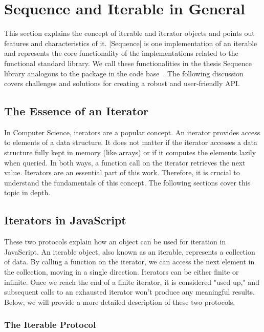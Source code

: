 \section{Sequence and Iterable in General}
\label{sec:Sequence and Iterable in General}
This section explains the concept of iterable and iterator objects and points
out features and characteristics of it. |Sequence| is one implementation of
an iterable and represents the core functionality of the implementations
related to the functional standard library. We call these functionalities in
the thesis Sequence library analogous to the package in the code
base~\cite{wildwyss_kolibri}. The following
discussion covers challenges and solutions for creating a robust and
user-friendly API.

\subsection{The Essence of an Iterator}
\label{sub:The Essence of an Iterator}
In Computer Science, iterators are a popular concept. An iterator provides
access to elements of a data structure. It does not matter if the iterator
accesses a data structure fully kept in memory (like arrays) or if it computes
the elements lazily when queried. In both ways, a function call on the iterator
retrieves the next value. Iterators are an essential part of this work.
Therefore, it is crucial to understand the fundamentals of this concept. The
following sections cover this topic in depth.

\subsection{Iterators in JavaScript}
\label{sub:Iterators in JavaScript}
These two protocols explain how an object can be used for iteration in
JavaScript. An iterable object, also known as an iterable, represents a
collection of data. By calling a function on the iterator, we can access the
next element in the collection, moving in a single direction. Iterators can be
either finite or infinite. Once we reach the end of a finite iterator, it is
considered "used up," and subsequent calls to an exhausted iterator won't
produce any meaningful results. Below, we will provide a more detailed
description of these two protocols.

\subsubsection{The Iterable Protocol}
\label{subsub:The Iterable Protocol}

